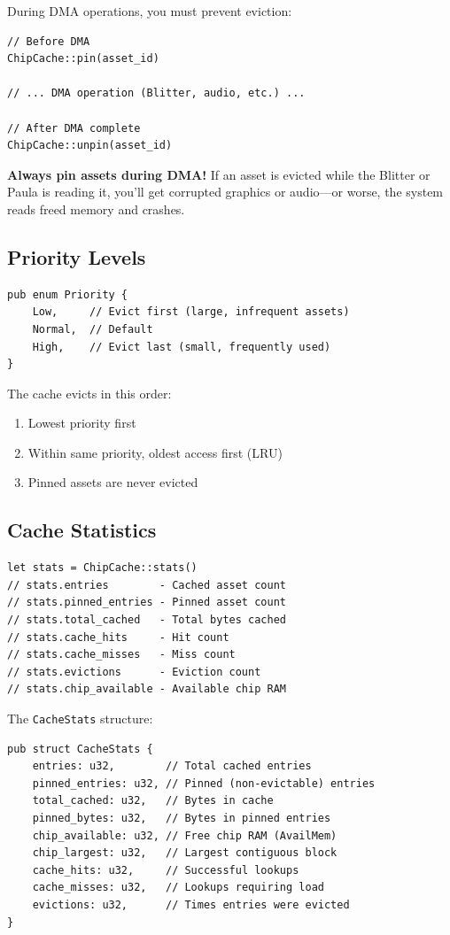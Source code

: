 During DMA operations, you must prevent eviction:

\begin{lstlisting}
// Before DMA
ChipCache::pin(asset_id)

// ... DMA operation (Blitter, audio, etc.) ...

// After DMA complete
ChipCache::unpin(asset_id)
\end{lstlisting}

\begin{warningbox}
\textbf{Always pin assets during DMA!} If an asset is evicted while the Blitter or Paula is reading it, you'll get corrupted graphics or audio---or worse, the system reads freed memory and crashes.
\end{warningbox}

\subsection{Priority Levels}

\begin{lstlisting}
pub enum Priority {
    Low,     // Evict first (large, infrequent assets)
    Normal,  // Default
    High,    // Evict last (small, frequently used)
}
\end{lstlisting}

The cache evicts in this order:
\begin{enumerate}
    \item Lowest priority first
    \item Within same priority, oldest access first (LRU)
    \item Pinned assets are never evicted
\end{enumerate}

\subsection{Cache Statistics}

\begin{lstlisting}
let stats = ChipCache::stats()
// stats.entries        - Cached asset count
// stats.pinned_entries - Pinned asset count
// stats.total_cached   - Total bytes cached
// stats.cache_hits     - Hit count
// stats.cache_misses   - Miss count
// stats.evictions      - Eviction count
// stats.chip_available - Available chip RAM
\end{lstlisting}

The \texttt{CacheStats} structure:

\begin{lstlisting}
pub struct CacheStats {
    entries: u32,        // Total cached entries
    pinned_entries: u32, // Pinned (non-evictable) entries
    total_cached: u32,   // Bytes in cache
    pinned_bytes: u32,   // Bytes in pinned entries
    chip_available: u32, // Free chip RAM (AvailMem)
    chip_largest: u32,   // Largest contiguous block
    cache_hits: u32,     // Successful lookups
    cache_misses: u32,   // Lookups requiring load
    evictions: u32,      // Times entries were evicted
}
\end{lstlisting}


